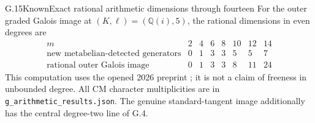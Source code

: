 \begin{statement}{G.15}{Known}{Exact rational arithmetic dimensions through fourteen}
For the outer graded Galois image at $(K,\ell)=(\mathbb Q(i),5)$,
the rational dimensions in even degrees are
\[
\begin{array}{c|rrrrrrr}
m&2&4&6&8&10&12&14\\\hline
\text{new metabelian-detected generators}&0&1&3&3&5&5&7\\
\text{rational outer Galois image}&0&1&3&3&8&11&24
\end{array}                                             \tag{G.17}
\]
This computation uses the opened 2026 preprint
\citet[Theorem 1.2 and Lemma 1.5]{Ishii2026Graded}; it is not
a claim of freeness in unbounded degree. All CM character
multiplicities are in \texttt{g\_arithmetic\_results.json}.
The genuine standard-tangent image additionally has
the central degree-two line of G.4.
\end{statement}
